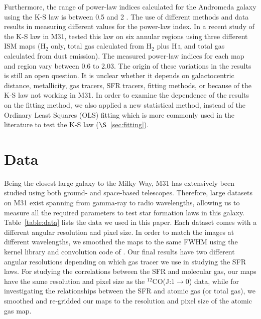 Furthermore, the range of power-law indices calculated for the Andromeda galaxy using the K-S law is between 0.5 and 2 \citep[e.g.][]{Tabatabaei10,Ford13}. The use of different methods and data results in measuring different values for the power-law index. In a recent study of the K-S law in M31, \citet{Ford13} tested this law on six annular regions using three different ISM maps (H$_2$ only, total gas calculated from H$_2$ plus H\,{\textsc i}, and total gas calculated from dust emission). The measured power-law indices for each map and region vary between 0.6 to 2.03. The origin of these variations in the results is still an open question. It is unclear whether it depends on galactocentric distance, metallicity, gas tracers, SFR tracers, fitting methods, or because of the K-S law not working in M31. In order to examine the dependence of the results on the fitting method, we also applied a new statistical method, instead of the Ordinary Least Squares (OLS) fitting which is more commonly used in the literature to test the K-S law ($\S$~\ref{sec:fitting}). 




\section{Data}
\label{sec: data_sfl}
Being the closest large galaxy to the Milky Way, M31 has extensively been studied using both ground- and space-based telescopes. Therefore, large datasets on M31 exist spanning from gamma-ray to radio wavelengths, allowing us to measure all the required parameters to test star formation laws in this galaxy. Table~\ref{table:data} lists the data we used in this paper. Each dataset comes with a different angular resolution and pixel size. In order to match the images at different wavelengths, we smoothed the maps to the same FWHM using the kernel library and convolution code of \citet{Aniano11}. Our final results have two different angular resolutions depending on which gas tracer we use in studying the SFR laws. For studying the correlations between the SFR and molecular gas, our maps have the same resolution and pixel size as the $^{12}$CO(J:$1\rightarrow0$) data, while for investigating the relationships between the SFR and atomic gas (or total gas), we smoothed and re-gridded our maps to the resolution and pixel size of the atomic gas map.


